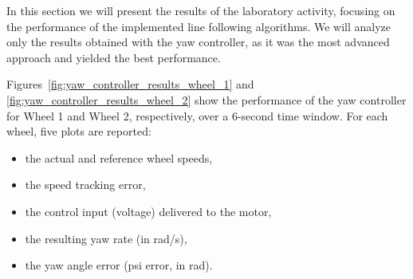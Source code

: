 In this section we will present the results of the laboratory activity, focusing on the performance of the implemented line following algorithms.
We will analyze only the results obtained with the yaw controller, as it was the most advanced approach and yielded the best performance.

Figures~\ref{fig:yaw_controller_results_wheel_1} and \ref{fig:yaw_controller_results_wheel_2} show the performance of the yaw controller for Wheel 1 and Wheel 2, respectively, over a 6-second time window. 
For each wheel, five plots are reported:
\begin{itemize}
    \item the actual and reference wheel speeds,
    \item the speed tracking error,
    \item the control input (voltage) delivered to the motor,
    \item the resulting yaw rate (in rad/s),
    \item the yaw angle error (psi error, in rad).
\end{itemize}

